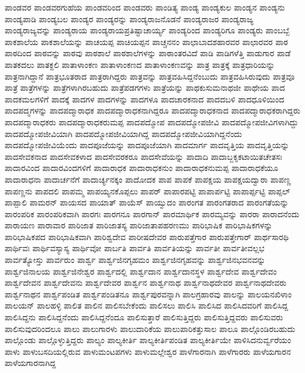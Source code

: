 {ಪಾಂಡವರ
ಪಾಂಡವರಗುಹೆಯ
ಪಾಂಡವರಿಂದ
ಪಾಂಡವರು
ಪಾಂಡಿತ್ಯ
ಪಾಂಡ್ಯ
ಪಾಂಡ್ಯಕುಲ
ಪಾಂಡ್ಯನ
ಪಾಂಡ್ಯನು
ಪಾಂಡ್ಯಪಾಡಿ
ಪಾಂಡ್ಯಬಲ
ಪಾಂಡ್ಯರ
ಪಾಂಡ್ಯರನ್ನು
ಪಾಂಡ್ಯರಾಜನೊಡನೆ
ಪಾಂಡ್ಯರಾಜರ
ಪಾಂಡ್ಯರಾಜ್ಯ
ಪಾಂಡ್ಯರಾಜ್ಯವನ್ನು
ಪಾಂಡ್ಯರಾಯ
ಪಾಂಡ್ಯರಾಯಪ್ರತಿಷ್ಟಾಚಾರ್ಯ್ಯ
ಪಾಂಡ್ಯರಿಂದ
ಪಾಂಡ್ಯರಿಗೂ
ಪಾಂಡ್ಯರು
ಪಾಂಬಬ್ಬೆ
ಪಾಕಶಾಲೆಯ
ಪಾಕಶಾಲೆಯನ್ನು
ಪಾಚಯಪ್ಪ
ಪಾಚಿಯಪ್ಪನ
ಪಾಚ್ಚನನಂ
ಪಾಛಾಬಾದಶಹಾರವರ
ಪಾಛಾರವರ
ಪಾಠ
ಪಾಠದಿಂದ
ಪಾಠವನ್ನು
ಪಾಠವು
ಪಾಠಶಾಲೆ
ಪಾಠಶಾಲೆಗಳನ್ನು
ಪಾಠಾಂತರವಿದೆ
ಪಾಡಿ
ಪಾಡಿಗಳೆತ್ತಿ
ಪಾಡುಗಾರ
ಪಾಡೆ
ಪಾತಕದಲು
ಪಾತಕ್ದಲಿ
ಪಾತಾಳಾಂಕಣ
ಪಾತಾಳಾಂಕಣದ
ಪಾತಾಳಾಂಕಣವನ್ನು
ಪಾತ್ರ
ಪಾತ್ರಕ್ಕೆ
ಪಾತ್ರಧಾರಿಯನ್ನು
ಪಾತ್ರನಾಗಿದ್ದಾನೆ
ಪಾತ್ರಭೂತರಾದ
ಪಾತ್ರರಾಗಿದ್ದರು
ಪಾತ್ರವನ್ನು
ಪಾತ್ರವಹಿಸಿದ್ದನೆಂಬುದು
ಪಾತ್ರವಹಿಸಿರುವುದು
ಪಾತ್ರವೂ
ಪಾತ್ರೆ
ಪಾತ್ರೆಗಳನ್ನು
ಪಾತ್ರೆಗಳಾಗಿರಬಹುದು
ಪಾತ್ರೆಪಡಗಗಳು
ಪಾತ್ರೆಯನ್ನು
ಪಾಥಕುಸುಮನಾಥಜೀ
ಪಾಥೇಯ
ಪಾದ
ಪಾದಕಮಲಗಳಿಗೆ
ಪಾದಕ್ಕೆ
ಪಾದಗಳ
ಪಾದಗಳನ್ನು
ಪಾದಗಳೂ
ಪಾದಚಾರಕನಾದ
ಪಾದದಬಳಿ
ಪಾದಧೂಳಿಯಿಂದ
ಪಾದಪದ್ಮಗಳನ್ನು
ಪಾದಪದ್ಮಾರಾಧಕ
ಪಾದಪದ್ಮಾರಾಧಕನಾಗಿದ್ದರೂ
ಪಾದಪದ್ಮಾರಾಧಕನಾದ
ಪಾದಪದ್ಮಾರಾಧಕರಾಗಿದ್ದರು
ಪಾದಪದ್ಮಾರಾಧಕರು
ಪಾದಪದ್ಮಾರಾಧಕರುಮಪ್ಪ
ಪಾದಪದ್ಮೋಪ
ಪಾದಪದ್ಮೋಪಜೀವಿ
ಪಾದಪದ್ಮೋಪಜೀವಿಗಳಾಗಿದ್ದು
ಪಾದಪದ್ಮೋಪಜೀವಿಯಾಗಿ
ಪಾದಪದ್ಮೋಪಜೀವಿಯಾಗಿದ್ದ
ಪಾದಪದ್ಮೋಪಜೀವಿಯಾಗಿದ್ದನೆಂದು
ಪಾದಪದ್ಮೋಪಜೀವಿಯೆಂದು
ಪಾದಪೂಜೆಯನ್ನು
ಪಾದಪೂಜೆಯಾಗಿ
ಪಾದಮಾರ್ಗ
ಪಾದವೃತ್ತಿಯ
ಪಾದವೃತ್ತಿಯನ್ನು
ಪಾದಸೇವಕನಾದ
ಪಾದಸೇವಕಳಾದ
ಪಾದಸೇವರಕರೂ
ಪಾದಸೇವೆಯನ್ನು
ಪಾದಾದಿ
ಪಾದಾಬ್ಜಕೃಕಟಾಯಿತಚೇತಸಃ
ಪಾದಾರವಿಂದ
ಪಾದಾರವಿಂದಗಳಿಗೆ
ಪಾದಾರಾಧಕ
ಪಾದಾರಾಧಕನುಂ
ಪಾದಾರಾಧಕನುಮಪ್ಪ
ಪಾದಾರಾಧಕೆಯೂ
ಪಾದಾರಾಧನಾ
ಪಾದಾರ್ಚನೆಗೆ
ಪಾದಾರ್ಚ್ಯನಕ್ಕಂ
ಪಾದೋದಕ
ಪಾಪ
ಪಾಪಕೆ
ಪಾಪಕ್ಷಯ
ಪಾಪಕ್ಷಯದ್ವಾರಾ
ಪಾಪಣ್ಣ
ಪಾಪಣ್ಣನು
ಪಾಪದಲಿ
ಪಾಪಮ್ಮ
ಪಾಪಯ್ಯನಕೊಪ್ಪಲು
ಪಾಪರ್
ಪಾಪಾರಪಟ್ಟಿ
ಪಾಪಾರ್ಪಟ್ಟಿ
ಪಾಪಾರ್ಪ್ಪಟ್ಟಿ
ಪಾಪ್ಪಲ್
ಪಾಪ್ಪಾಲಿ
ಪಾಮರನ್
ಪಾಯಸದ
ಪಾಯಾತ್
ಪಾಯೆಸ್
ಪಾಯ್ವುದಂ
ಪಾರಂಗತ
ಪಾರಂಗತರಾದ
ಪಾರಂಗತೆಯನ್ನು
ಪಾರಂಪರಿಕ
ಪಾರಂಪರಿಕವಾಗಿ
ಪಾರಗಃ
ಪಾರಗನೂ
ಪಾರಗಾನ್
ಪಾರಮಾರ್ಥಿಕ
ಪಾರಮ್ಯವನ್ನು
ಪಾರರಾ
ಪಾರಾದನೆಂದು
ಪಾರಾಯಣ
ಪಾರಾವಾರ
ಪಾರಿಜಾತ
ಪಾರಿಜಾತಸ್ಯ
ಪಾರಿಜಾತಾಪಹರಣಮು
ಪಾರಿಭಾಷಿಕ
ಪಾರಿಭಾಷಿಕಗಳನ್ನು
ಪಾರಿಭಾಷಿಕಪದ
ಪಾರಿಭಾಷಿಕವಾಗಿ
ಪಾರಿಶ್ವದೇವ
ಪಾರೀಷದೇವರ
ಪಾರುಪತ್ತೆಗಾರ
ಪಾರುಪತ್ತೇಗಾರ್
ಪಾರ್ಥಸಾರಥಿ
ಪಾರ್ಥಿವಃ
ಪಾರ್ಥಿವಸ್ಯಾಸ್ಯ
ಪಾರ್ಥಿವೋ
ಪಾರ್ಬತಿ
ಪಾರ್ವತಿ
ಪಾರ್ವತಿಯನ್ನು
ಪಾರ್ವತೀ
ಪಾರ್ವತೀವಲ್ಲಭ
ಪಾರ್ವತ್ಯೋಸ್ತು
ಪಾರ್ವರುಂ
ಪಾರ್ಶ್ವ
ಪಾರ್ಶ್ವಜಿನಗೃಹಮಂ
ಪಾರ್ಶ್ವಜಿನಗೃಹವನ್ನು
ಪಾರ್ಶ್ವಜಿನಭವನವನ್ನು
ಪಾರ್ಶ್ವಜಿನಾಲಯ
ಪಾರ್ಶ್ವಜಿನೇಶ್ವರ
ಪಾರ್ಶ್ವದಲ್ಲಿ
ಪಾರ್ಶ್ವದಾನ
ಪಾರ್ಶ್ವದಾನಸ್ಥಳ
ಪಾರ್ಶ್ವದೇವ
ಪಾರ್ಶ್ವದೇವಂ
ಪಾರ್ಶ್ವದೇವನ
ಪಾರ್ಶ್ವದೇವನು
ಪಾರ್ಶ್ವದೇವರ
ಪಾರ್ಶ್ವನ
ಪಾರ್ಶ್ವನಾಥ
ಪಾರ್ಶ್ವನಾಥದೇವರ
ಪಾರ್ಶ್ವನಾಥದೇವರು
ಪಾರ್ಶ್ವನಾಥನ
ಪಾರ್ಶ್ವಪಂಡಿತ
ಪಾರ್ಶ್ವಪಂಡಿತನೂ
ಪಾರ್ಶ್ವಪುರವನ್ನಾಗಿ
ಪಾಲಗ್ರಹಾರವು
ಪಾಲನ್ನು
ಪಾಲಯನಖಿಳಾಂ
ಪಾಲಯನ್
ಪಾಲಹಳ್ಳಿ
ಪಾಲಿತ
ಪಾಲಿನ
ಪಾಲಿಸಬೇಕೆಂದು
ಪಾಲಿಸಲು
ಪಾಲಿಸಿ
ಪಾಲಿಸಿದ
ಪಾಲಿಸಿದವರಿಗೆ
ಪಾಲಿಸಿದ್ದ
ಪಾಲಿಸಿದ್ದನು
ಪಾಲಿಸಿದ್ದನೆಂದು
ಪಾಲಿಸಿದ್ದನೆಂದೂ
ಪಾಲಿಸುತ್ತಾರೆ
ಪಾಲಿಸುತ್ತಿದ್ದರು
ಪಾಲಿಸುತ್ತಿದ್ದವರು
ಪಾಲಿಸುವರು
ಪಾಲಿಸುವುದರಿಂದಲೂ
ಪಾಲು
ಪಾಲುಗಾರಳು
ಪಾಲುದಾರಿಕೆಯ
ಪಾಲುಪಾರಿಕತ್ತುಸಾಲ
ಪಾಲೂ
ಪಾಲ್ಗೊಂಡಿರಬಹುದು
ಪಾಲ್ಗೊಂಡು
ಪಾಲ್ಗೊಳ್ಳುತ್ತಿದ್ದರು
ಪಾಲ್ಯಂ
ಪಾಲ್ಯಕೀರ್ತಿ
ಪಾಲ್ಯಕೀರ್ತಿಪಂಡಿತ
ಪಾಲ್ಯಕೀರ್ತಿಯೇ
ಪಾಳಿಸಿದನುರ್ವ್ವರೆಯಂ
ಪಾಳು
ಪಾಳುಬಸದಿಯಲ್ಲಿರುವ
ಪಾಳುಮಂಟಪಗಳು
ಪಾಳುಮಲ್ಲೇಶ್ವರ
ಪಾಳೆಗಾರನಾಗಿ
ಪಾಳೆಗಾರರು
ಪಾಳೆಯಗಾರನ
ಪಾಳೆಯಗಾರನಾಗಿದ್ದ
}
